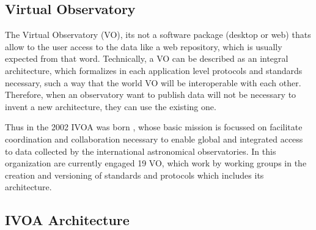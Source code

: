 \subsection{Virtual Observatory}


The Virtual Observatory (VO), its not a software package (desktop or web) thats
allow to the user access to the data like a web repository, which is usually
expected from that word. Technically, a VO can be described as an integral
architecture, which formalizes in each application level protocols and
standards necessary, such a way that the world VO will be interoperable with
each other.  Therefore, when an observatory want to publish data will not be
necessary to invent a new architecture, they can use the existing one.

Thus in the 2002 IVOA was born \cite{ivoa}, whose basic mission is focussed on
facilitate coordination and collaboration necessary to enable global and
integrated access to data collected by the international astronomical
observatories. In this organization are currently engaged 19 VO, which work by
working groups in the creation and versioning of standards and protocols which
includes its architecture.

\subsection{IVOA Architecture}


